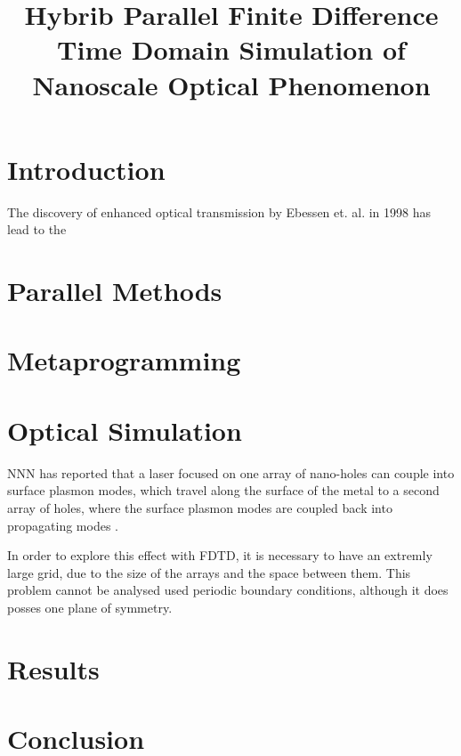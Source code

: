 \documentclass[11pt, conference, draftcls, letterpaper]{IEEEtran}
\begin{document}
\title{Hybrib Parallel Finite Difference Time Domain Simulation of
  Nanoscale Optical Phenomenon}
\author{ 
}

\maketitle

\begin{abstract}
  
\end{abstract}


\section{Introduction}
The discovery of enhanced optical transmission by Ebessen
et. al. \cite{ebessen1998} in 1998 has lead to the 

\section{Parallel Methods}

\section{Metaprogramming}

\section{Optical Simulation}
NNN has reported that a laser focused on one array of nano-holes can
couple into surface plasmon modes, which travel along the surface of
the metal to a second array of holes, where the surface plasmon modes
are coupled back into propagating modes \cite{}. 

In order to explore this effect with FDTD, it is necessary to have
an extremly large grid, due to the size of the arrays and the space
between them. This problem cannot be analysed used periodic boundary
conditions, although it does posses one plane of symmetry. 

\section{Results}

\section{Conclusion}




\end{document}
